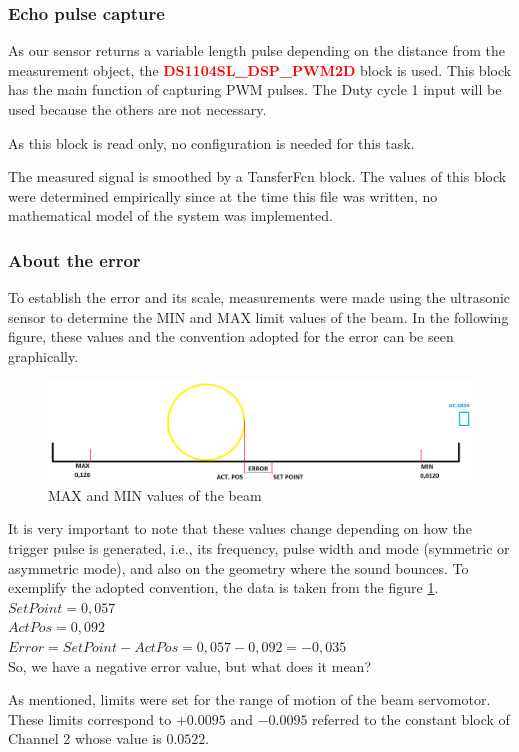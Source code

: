 \subsubsection{Echo pulse capture}
As our sensor returns a variable length pulse depending on the distance from the measurement object, the \textcolor{red}{\textbf{DS1104SL\_DSP\_PWM2D}} block is used. This block has the main function of capturing PWM pulses.
The Duty cycle 1 input will be used because the others are not necessary.\par
As this block is read only, no configuration is needed for this task.\par
The measured signal is smoothed by a TansferFcn block. The values of this block were determined empirically since at the time this file was written, no mathematical model of the system was implemented.
\subsubsection{About the error}
To establish the error and its scale, measurements were made using the ultrasonic sensor to determine the MIN and MAX limit values of the beam. In the following figure, these values and the convention adopted for the error can be seen graphically.
\begin{figure}[H]
    \centering
    \includegraphics[width=\textwidth]{Images/Ball and Bean/Hardware/MAX-MIN.png}
    \caption{MAX and MIN values of the beam}
    \label{fig44}
\end{figure}
It is very important to note that these values change depending on how the trigger pulse is generated, i.e., its frequency, pulse width and mode (symmetric or asymmetric mode), and also on the geometry where the sound bounces. To exemplify the adopted convention, the data is taken from the figure \ref{fig44}.
    \noindent $SetPoint = 0,057$\\
    $ActPos = 0,092$\\
    $Error = SetPoint - ActPos = 0,057 - 0,092 = -0,035$\\
    So, we have a negative error value, but what does it mean?\par
As mentioned, limits were set for the range of motion of the beam servomotor. These limits correspond to $+0.0095$ and $-0.0095$ referred to the constant block of Channel 2 whose value is $0.0522$.
